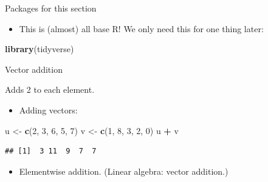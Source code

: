 \documentclass[
  ignorenonframetext,
]{beamer}
\newenvironment{Shaded}{\begin{snugshade}}{\end{snugshade}}
\newcommand{\DecValTok}[1]{\textcolor[rgb]{0.00,0.00,0.81}{#1}}
\newcommand{\KeywordTok}[1]{\textcolor[rgb]{0.13,0.29,0.53}{\textbf{#1}}}
\newcommand{\NormalTok}[1]{#1}
\newcommand{\OperatorTok}[1]{\textcolor[rgb]{0.81,0.36,0.00}{\textbf{#1}}}
\newcommand{\StringTok}[1]{\textcolor[rgb]{0.31,0.60,0.02}{#1}}
\providecommand{\tightlist}{%
  \setlength{\itemsep}{0pt}\setlength{\parskip}{0pt}}
\begin{document}
\begin{frame}[fragile]{Packages for this section}
\protect\hypertarget{packages-for-this-section-10}{}

\begin{itemize}
\tightlist
\item
  This is (almost) all base R! We only need this for one thing later:
\end{itemize}

\begin{Shaded}
\begin{Highlighting}[]
\KeywordTok{library}\NormalTok{(tidyverse)}
\end{Highlighting}
\end{Shaded}

\end{frame}

\begin{frame}[fragile]{Vector addition}
\protect\hypertarget{vector-addition}{}

Adds 2 to each element.

\begin{itemize}
\tightlist
\item
  Adding vectors:
\end{itemize}

\begin{Shaded}
\begin{Highlighting}[]
\NormalTok{u <-}\StringTok{ }\KeywordTok{c}\NormalTok{(}\DecValTok{2}\NormalTok{, }\DecValTok{3}\NormalTok{, }\DecValTok{6}\NormalTok{, }\DecValTok{5}\NormalTok{, }\DecValTok{7}\NormalTok{)}
\NormalTok{v <-}\StringTok{ }\KeywordTok{c}\NormalTok{(}\DecValTok{1}\NormalTok{, }\DecValTok{8}\NormalTok{, }\DecValTok{3}\NormalTok{, }\DecValTok{2}\NormalTok{, }\DecValTok{0}\NormalTok{)}
\NormalTok{u }\OperatorTok{+}\StringTok{ }\NormalTok{v}
\end{Highlighting}
\end{Shaded}

\begin{verbatim}
## [1]  3 11  9  7  7
\end{verbatim}

\begin{itemize}
\tightlist
\item
  Elementwise addition. (Linear algebra: vector addition.)
\end{itemize}

\end{frame}
\end{document}
